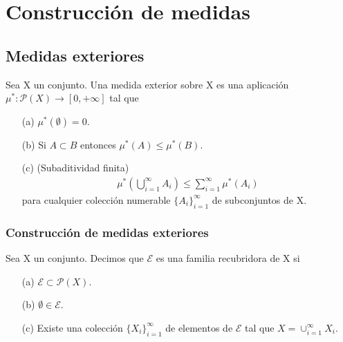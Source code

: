 \chapter{Construcción de medidas}

\section{Medidas exteriores}

\begin{defi}
Sea X un conjunto. Una medida exterior sobre X es una aplicación $\mu^*: \mathcal{P}(X) \longrightarrow [0,+\infty]$ tal que
\begin{enumerate}
    \item[(a)] $\mu^*(\emptyset) = 0$.
    \item[(b)] Si $A \subset B$ entonces $\mu^*(A) \leq \mu^*(B)$.
    \item[(c)] (Subaditividad finita)
    \begin{align*}
        \mu^*\left(\bigcup_{i=1}^{\infty}{A_i} \right) \leq \sum_{i=1}^{\infty}{\mu^*(A_i)}
    \end{align*}
    para cualquier colección numerable $\{A_i\}_{i=1}^{\infty}$ de subconjuntos de X.
\end{enumerate}
\end{defi}

\subsection{Construcción de medidas exteriores}

\begin{defi}
Sea X un conjunto. Decimos que $\mathcal{E}$ es una familia recubridora de X si
\begin{enumerate}
    \item[(a)] $\mathcal{E} \subset \mathcal{P}(X)$.
    \item[(b)] $\emptyset \in \mathcal{E}$.
    \item[(c)] Existe una colección $\{X_i\}_{i=1}^{\infty}$ de elementos de $\mathcal{E}$ tal que 
    $X = \cup_{i=1}^{\infty}{X_i}$.
\end{enumerate}
\end{defi}

